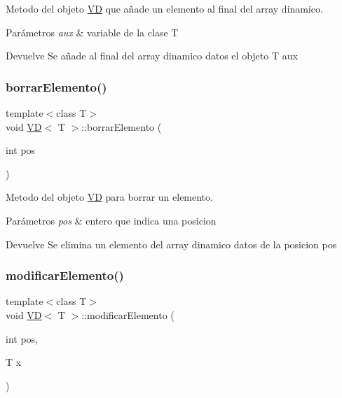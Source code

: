 Metodo del objeto \hyperlink{classVD}{VD} que añade un elemento al final del array dinamico. 


\begin{DoxyParams}{Parámetros}
{\em aux} & variable de la clase T \\
\hline
\end{DoxyParams}
\begin{DoxyReturn}{Devuelve}
Se añade al final del array dinamico datos el objeto T aux 
\end{DoxyReturn}
\mbox{\label{classVD_a1ada7fe4356a885e7b90e396bbd6af24}} 
\subsubsection{\texorpdfstring{borrar\+Elemento()}{borrarElemento()}}
{\footnotesize\ttfamily template$<$class T$>$ \\
void \hyperlink{classVD}{VD}$<$ T $>$\+::borrar\+Elemento (\begin{DoxyParamCaption}\item[{int}]{pos }\end{DoxyParamCaption})\hspace{0.3cm}{\ttfamily [inline]}}



Metodo del objeto \hyperlink{classVD}{VD} para borrar un elemento. 


\begin{DoxyParams}{Parámetros}
{\em pos} & entero que indica una posicion \\
\hline
\end{DoxyParams}
\begin{DoxyReturn}{Devuelve}
Se elimina un elemento del array dinamico datos de la posicion pos 
\end{DoxyReturn}
\mbox{\label{classVD_a771eef0cc3fc7671dce4666dd17474a6}} 
\subsubsection{\texorpdfstring{modificar\+Elemento()}{modificarElemento()}}
{\footnotesize\ttfamily template$<$class T$>$ \\
void \hyperlink{classVD}{VD}$<$ T $>$\+::modificar\+Elemento (\begin{DoxyParamCaption}\item[{int}]{pos,  }\item[{T}]{x }\end{DoxyParamCaption})\hspace{0.3cm}{\ttfamily [inline]}}



